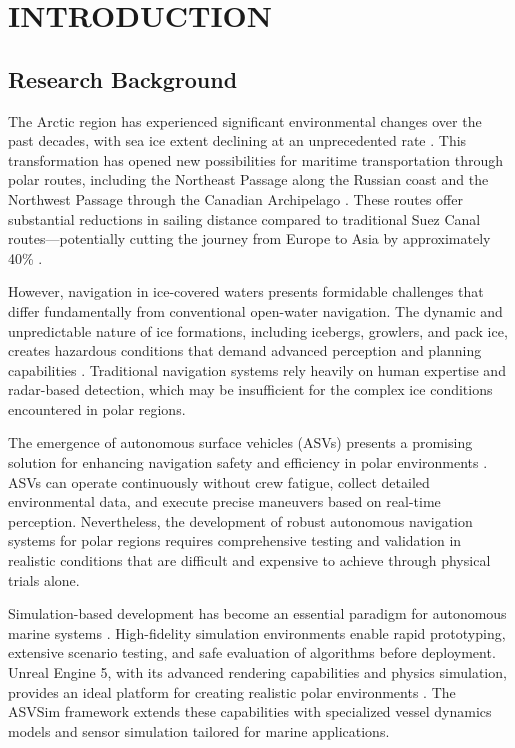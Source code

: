 \clearpage
\section{INTRODUCTION}

\subsection{Research Background}

The Arctic region has experienced significant environmental changes over the past decades, with sea ice extent declining at an unprecedented rate \parencite{stocker2013climate}. This transformation has opened new possibilities for maritime transportation through polar routes, including the Northeast Passage along the Russian coast and the Northwest Passage through the Canadian Archipelago \parencite{ebner2016polar}. These routes offer substantial reductions in sailing distance compared to traditional Suez Canal routes---potentially cutting the journey from Europe to Asia by approximately 40\% \parencite{verma2018arctic}.

However, navigation in ice-covered waters presents formidable challenges that differ fundamentally from conventional open-water navigation. The dynamic and unpredictable nature of ice formations, including icebergs, growlers, and pack ice, creates hazardous conditions that demand advanced perception and planning capabilities \parencite{fu2018review}. Traditional navigation systems rely heavily on human expertise and radar-based detection, which may be insufficient for the complex ice conditions encountered in polar regions.

The emergence of autonomous surface vehicles (ASVs) presents a promising solution for enhancing navigation safety and efficiency in polar environments \parencite{liu2016unmanned}. ASVs can operate continuously without crew fatigue, collect detailed environmental data, and execute precise maneuvers based on real-time perception. Nevertheless, the development of robust autonomous navigation systems for polar regions requires comprehensive testing and validation in realistic conditions that are difficult and expensive to achieve through physical trials alone.

Simulation-based development has become an essential paradigm for autonomous marine systems \parencite{schroeder2020asvsim}. High-fidelity simulation environments enable rapid prototyping, extensive scenario testing, and safe evaluation of algorithms before deployment. Unreal Engine 5, with its advanced rendering capabilities and physics simulation, provides an ideal platform for creating realistic polar environments \parencite{epic2023unreal}. The ASVSim framework extends these capabilities with specialized vessel dynamics models and sensor simulation tailored for marine applications.

